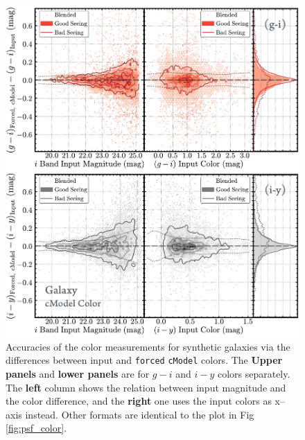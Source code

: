 \documentclass[useamsfonts]{pasj01}
\def\cmodel{\texttt{cModel}}
\def\forced{\texttt{forced}}
\begin{document}
\begin{figure}
    \begin{center}
        \includegraphics[width=\textwidth]{fig/synpipe_galaxy_color}
    \end{center}
    \caption{
        Accuracies of the color measurements for synthetic galaxies via the
        differences between input and \forced{} \cmodel{} colors.
        The \textbf{Upper panels} and \textbf{lower panels} are for $g-i$ and $i-y$
        colors separately.
        The \textbf{left} column shows the relation between input magnitude and
        the color difference, and the \textbf{right} one uses the input colors as
        x--axis instead.
        Other formats are identical to the plot in Fig \ref{fig:psf_color}.
        }
    \label{fig:cmodel_color}
\end{figure}
\end{document}
